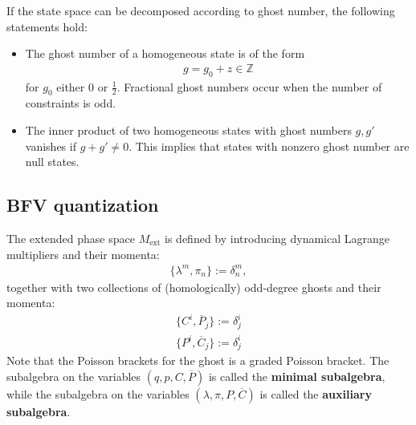     \begin{property}
        If the state space can be decomposed according to ghost number, the following statements hold:
        \begin{itemize}
            \item The ghost number of a homogeneous state is of the form
                \begin{gather}
                    g = g_0 + z\in\mathbb{Z}
                \end{gather}
                for $g_0$ either $0$ or $\frac{1}{2}$. Fractional ghost numbers occur when the number of constraints is odd.
            \item The inner product of two homogeneous states with ghost numbers $g,g'$ vanishes if $g+g'\neq0$. This implies that states with nonzero ghost number are null states.
        \end{itemize}
    \end{property}


\subsection{BFV quantization}

    The extended phase space $M_{\text{ext}}$ is defined by introducing dynamical Lagrange multipliers and their momenta:
    \begin{gather}
        \{\lambda^m,\pi_n\} := \delta^m_n,
    \end{gather}
    together with two collections of (homologically) odd-degree ghosts and their momenta:
    \begin{gather}
        \{C^i,\overline{P}_j\} := \delta^i_j\\
        \{P^i,\overline{C}_j\} := \delta^i_j
    \end{gather}
    Note that the Poisson brackets for the ghost is a graded Poisson bracket. The subalgebra on the variables $(q,p,C,\overline{P})$ is called the \textbf{minimal subalgebra}, while the subalgebra on the variables $(\lambda,\pi,P,\overline{C})$ is called the \textbf{auxiliary subalgebra}.

